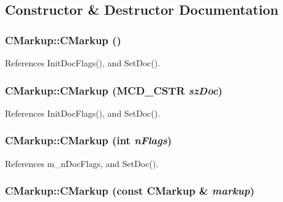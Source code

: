 \subsection{Constructor \& Destructor Documentation}
\subsubsection[CMarkup]{\setlength{\rightskip}{0pt plus 5cm}CMarkup::CMarkup ()\hspace{0.3cm}{\tt  [inline]}}\label{classCMarkup_ef1594806cb878a276025d452c919a29}




References InitDocFlags(), and SetDoc().
\subsubsection[CMarkup]{\setlength{\rightskip}{0pt plus 5cm}CMarkup::CMarkup ({\bf MCD\_\-CSTR} {\em szDoc})\hspace{0.3cm}{\tt  [inline]}}\label{classCMarkup_186b921d6af5fde01449e5365eef095c}




References InitDocFlags(), and SetDoc().
\subsubsection[CMarkup]{\setlength{\rightskip}{0pt plus 5cm}CMarkup::CMarkup (int {\em nFlags})\hspace{0.3cm}{\tt  [inline]}}\label{classCMarkup_9f3fdb3c94ce931f34e96bc387bfb199}




References m\_\-nDocFlags, and SetDoc().
\subsubsection[CMarkup]{\setlength{\rightskip}{0pt plus 5cm}CMarkup::CMarkup (const {\bf CMarkup} \& {\em markup})\hspace{0.3cm}{\tt  [inline]}}\label{classCMarkup_e4dc90b99846d35849bc323064fbafcf}


